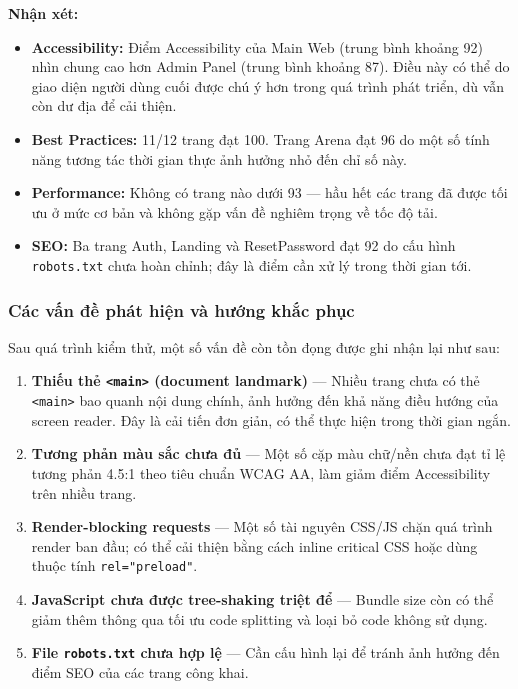 \textbf{Nhận xét:}
\begin{itemize}[leftmargin=*]
  \item \textbf{Accessibility:} Điểm Accessibility của Main Web (trung bình khoảng 92)
        nhìn chung cao hơn Admin Panel (trung bình khoảng 87). Điều này có thể do giao
        diện người dùng cuối được chú ý hơn trong quá trình phát triển, dù vẫn còn
        dư địa để cải thiện.
  \item \textbf{Best Practices:} 11/12 trang đạt 100. Trang Arena đạt 96 do một số
        tính năng tương tác thời gian thực ảnh hưởng nhỏ đến chỉ số này.
  \item \textbf{Performance:} Không có trang nào dưới 93 --- hầu hết các trang đã
        được tối ưu ở mức cơ bản và không gặp vấn đề nghiêm trọng về tốc độ tải.
  \item \textbf{SEO:} Ba trang Auth, Landing và ResetPassword đạt 92 do cấu hình
        \texttt{robots.txt} chưa hoàn chỉnh; đây là điểm cần xử lý trong thời gian tới.
\end{itemize}

\subsubsection{Các vấn đề phát hiện và hướng khắc phục}

Sau quá trình kiểm thử, một số vấn đề còn tồn đọng được ghi nhận lại như sau:

\begin{enumerate}[leftmargin=*]
  \item \textbf{Thiếu thẻ \texttt{<main>} (document landmark)} --- Nhiều trang chưa
        có thẻ \texttt{<main>} bao quanh nội dung chính, ảnh hưởng đến khả năng
        điều hướng của screen reader. Đây là cải tiến đơn giản, có thể thực hiện
        trong thời gian ngắn.
  \item \textbf{Tương phản màu sắc chưa đủ} --- Một số cặp màu chữ/nền chưa đạt tỉ
        lệ tương phản 4.5:1 theo tiêu chuẩn WCAG AA, làm giảm điểm Accessibility
        trên nhiều trang.
  \item \textbf{Render-blocking requests} --- Một số tài nguyên CSS/JS chặn quá trình
        render ban đầu; có thể cải thiện bằng cách inline critical CSS hoặc dùng
        thuộc tính \texttt{rel="preload"}.
  \item \textbf{JavaScript chưa được tree-shaking triệt để} --- Bundle size còn có thể
        giảm thêm thông qua tối ưu code splitting và loại bỏ code không sử dụng.
  \item \textbf{File \texttt{robots.txt} chưa hợp lệ} --- Cần cấu hình lại để tránh
        ảnh hưởng đến điểm SEO của các trang công khai.
\end{enumerate}

